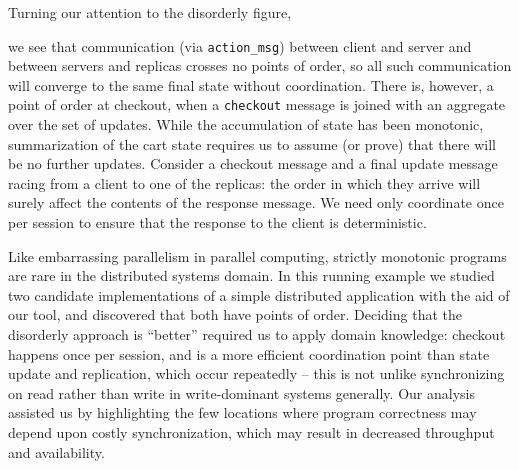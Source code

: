 Turning our attention to the disorderly figure,

we see that communication (via \texttt{action\_msg}) between client and server
and between servers and replicas crosses no points of order, so all such
communication will converge to the same final state without coordination.
There is, however, a point of order at checkout, when a \texttt{checkout}
message is joined with an aggregate over the set of updates.  While the 
accumulation of state has been monotonic, summarization of the cart state
requires us to assume (or prove) that there will be no further updates.
Consider a checkout message and a final update message racing from a client
to one of the replicas: the order in which they arrive will surely affect
the contents of the response message.  
We need only coordinate once per session to
ensure that the response to the client is deterministic.

Like embarrassing parallelism in parallel computing, strictly monotonic programs
are rare in the distributed systems domain.  In this running example we studied
two candidate implementations of a simple distributed application with the aid of
our tool, and discovered that both have points of order.  Deciding that the disorderly
approach is ``better'' required us to apply domain knowledge: checkout happens
once per session, and is a more efficient coordination point than state update and replication, 
which occur repeatedly -- this is not unlike synchronizing on read rather than write 
in write-dominant systems generally.  Our analysis assisted us by highlighting the few locations where program correctness may depend upon costly synchronization, which may
result in decreased throughput and availability.  

